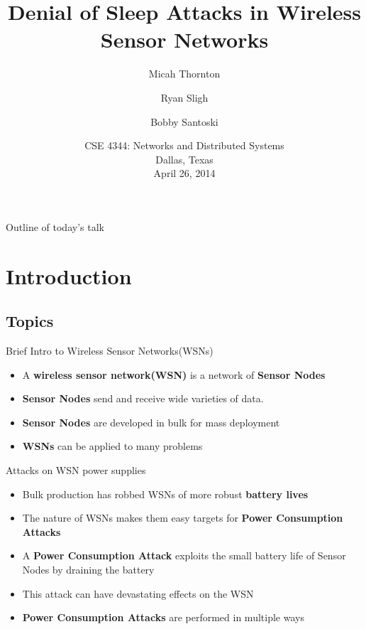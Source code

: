 \documentclass{beamer}
\title{Denial of Sleep Attacks in Wireless Sensor Networks}
\author[Micah Thornton \& Ryan Sligh \& Robert Santoski]{Micah Thornton \and {Ryan Sligh} \and Bobby Santoski}
\institute{Computer Science \& Engineering, Southern Methodist University, USA, \texttt{mathornton@smu.edu}}
\date[] 
{CSE 4344: Networks and Distributed Systems\\
Dallas, Texas\\
April 26, 2014}
\begin{document}
\begin{frame}
  \titlepage 
\end{frame}

 \begin{frame}{Outline of today's talk}
    \tableofcontents
  \end{frame}

\section{Introduction}
\subsection{Topics}

\begin{frame}{Brief Intro to Wireless Sensor Networks(WSNs)}
\begin{itemize}
	\item A \textbf{wireless sensor network(WSN)} is a network of \textbf{Sensor Nodes}
	\item \textbf{Sensor Nodes} send and receive wide varieties of data.
	\item \textbf{Sensor Nodes} are developed in bulk for mass deployment 
	\item \textbf{WSNs} can be applied to many problems
\end{itemize}
\end{frame}


\begin{frame}{Attacks on WSN power supplies}
\begin{itemize}
	\item Bulk production has robbed WSNs of more robust \textbf{battery lives}
	\item The nature of WSNs makes them easy targets for \textbf{Power Consumption Attacks}
	\item A \textbf{Power Consumption Attack} exploits the small battery life of Sensor Nodes by draining the battery
	\item This attack can have devastating effects on the WSN
	\item \textbf{Power Consumption Attacks} are performed in multiple ways
\end{itemize}	
\end{frame}
\end{document}
